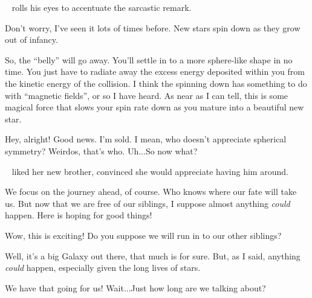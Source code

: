 \documentclass[main.tex]{subfiles}
\begin{document}
\par \nar \rmlacedaemon~ rolls his eyes to accentuate the sarcastic remark.

\par \Celaeno Don't worry, I've seen it lots of times before.  New stars spin down as they grow out of infancy.

\par \Celaeno So, the ``belly'' will go away.  You'll settle in to a more sphere-like shape in no time.  You just have to radiate away the excess energy deposited within you from the kinetic energy of the collision.  I think the spinning down has something to do with ``magnetic fields'', or so I have heard.  As near as I can tell, this is some magical force that slows your spin rate down as you mature into a beautiful new star.

\par \Lacedaemon Hey, alright!  Good news.  I'm sold.  I mean, who doesn't appreciate spherical symmetry?  Weirdos, that's who.  Uh...So now what?

\par \nar \rmcelaeno~ liked her new brother, convinced she would appreciate having him around.

\par \Celaeno We focus on the journey ahead, of course.  Who knows where our fate will take us.  But now that we are free of our siblings, I suppose almost anything \textit{could} happen.  Here is hoping for good things!

\par \Lacedaemon  Wow, this is exciting!  Do you suppose we will run in to our other siblings?

\par \Celaeno Well, it's a big Galaxy out there, that much is for sure.  But, as I said, anything \textit{could} happen, especially given the long lives of stars.  

\par \Lacedaemon We have that going for us!  Wait...Just how long are we talking about?
\end{document}
